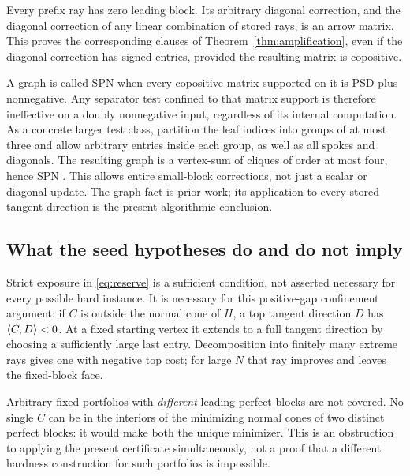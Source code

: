 Every prefix ray has zero leading block. Its arbitrary diagonal correction, and the diagonal correction of any linear combination of stored rays, is an arrow matrix. This proves the corresponding clauses of Theorem~\ref{thm:amplification}, even if the diagonal correction has signed entries, provided the resulting matrix is copositive.

A graph is called SPN when every copositive matrix supported on it is PSD plus nonnegative. Any separator test confined to that matrix support is therefore ineffective on a doubly nonnegative input, regardless of its internal computation. As a concrete larger test class, partition the leaf indices into groups of at most three and allow arbitrary entries inside each group, as well as all spokes and diagonals. The resulting graph is a vertex-sum of cliques of order at most four, hence SPN \cite[Corollaries 4.4 and 5.3]{SPN}. This allows entire small-block corrections, not just a scalar or diagonal update. The graph fact is prior work; its application to every stored tangent direction is the present algorithmic conclusion.

\subsection{What the seed hypotheses do and do not imply}
Strict exposure in \eqref{eq:reserve} is a sufficient condition, not asserted necessary for every possible hard instance. It is necessary for this positive-gap confinement argument: if $C$ is outside the normal cone of $H$, a top tangent direction $D$ has $\langle C,D\rangle<0$. At a fixed starting vertex it extends to a full tangent direction by choosing a sufficiently large last entry. Decomposition into finitely many extreme rays gives one with negative top cost; for large $N$ that ray improves and leaves the fixed-block face.

Arbitrary fixed portfolios with \emph{different} leading perfect blocks are not covered. No single $C$ can be in the interiors of the minimizing normal cones of two distinct perfect blocks: it would make both the unique minimizer. This is an obstruction to applying the present certificate simultaneously, not a proof that a different hardness construction for such portfolios is impossible.
